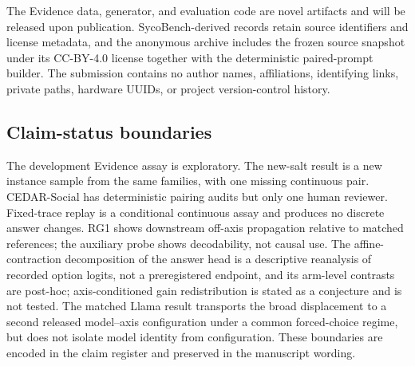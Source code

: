 \documentclass[letterpaper]{article}
\begin{document}
The Evidence data, generator, and evaluation code are novel artifacts and will be released upon publication. SycoBench-derived records retain source identifiers and license metadata, and the anonymous archive includes the frozen source snapshot under its CC-BY-4.0 license together with the deterministic paired-prompt builder. The submission contains no author names, affiliations, identifying links, private paths, hardware UUIDs, or project version-control history.

\subsection{Claim-status boundaries}

The development Evidence assay is exploratory.  The new-salt result is a new instance sample from the same families, with one missing continuous pair.  CEDAR-Social has deterministic pairing audits but only one human reviewer.  Fixed-trace replay is a conditional continuous assay and produces no discrete answer changes.  RG1 shows downstream off-axis propagation relative to matched references; the auxiliary probe shows decodability, not causal use.  The affine-contraction decomposition of the answer head is a descriptive reanalysis of recorded option logits, not a preregistered endpoint, and its arm-level contrasts are post-hoc; axis-conditioned gain redistribution is stated as a conjecture and is not tested. The matched Llama result transports the broad displacement to a second released model--axis configuration under a common forced-choice regime, but does not isolate model identity from configuration.  These boundaries are encoded in the claim register and preserved in the manuscript wording.


\end{document}
